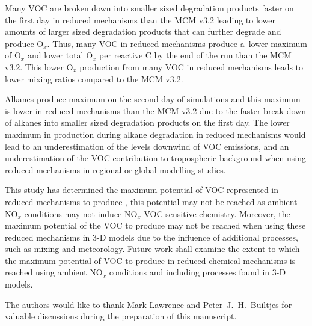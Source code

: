 \documentclass[acpd, online, hvmath]{copernicus}
\begin{document}
Many VOC are broken down into smaller sized degradation products
faster on the first day in reduced mechanisms than the MCM v3.2
leading to lower amounts of larger sized degradation products that can
further degrade and produce O$_{x}$.  Thus, many VOC in reduced
mechanisms produce a~lower maximum of O$_{x}$ and lower total
O$_{x}$ per reactive C by the end of the run than the MCM v3.2.
This lower O$_{x}$ production from many VOC in reduced mechanisms
leads to lower  mixing ratios compared to the MCM v3.2.

Alkanes produce maximum  on the second day of simulations
and this maximum is lower in reduced mechanisms than the MCM v3.2 due
to the faster break down of alkanes into smaller sized degradation
products on the first day.  The lower maximum in  production
during alkane degradation in reduced mechanisms would lead to an
underestimation of the  levels downwind of VOC emissions,
and an underestimation of the VOC contribution to tropospheric
background  when using reduced mechanisms in regional or
global modelling studies.

This study has determined the maximum potential of VOC represented in
reduced mechanisms to produce , this potential may not be
reached as ambient NO$_{x}$ conditions may not induce
NO$_{x}$-VOC-sensitive chemistry.  Moreover, the maximum potential
of the VOC to produce  may not be reached when using these
reduced mechanisms in 3-D models due to the influence of additional
processes, such as mixing and meteorology.  Future work shall examine
the extent to which the maximum potential of VOC to produce 
in reduced chemical mechanisms is reached using ambient NO$_{x}$
conditions and including processes found in 3-D models.






\begin{acknowledgements}
  The authors would like to thank Mark Lawrence and
  Peter~J.~H.~Builtjes for valuable discussions during the preparation
  of this manuscript.
\end{acknowledgements}
\end{document}
